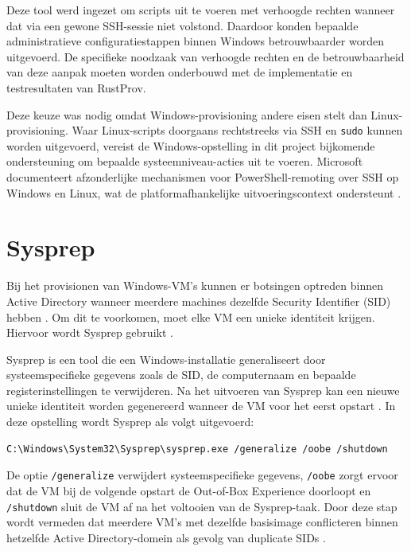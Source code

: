 Deze tool werd ingezet om scripts uit te voeren met verhoogde rechten wanneer dat via een gewone SSH-sessie niet volstond. Daardoor konden bepaalde administratieve configuratiestappen binnen Windows betrouwbaarder worden uitgevoerd. De specifieke noodzaak van verhoogde rechten en de betrouwbaarheid van deze aanpak moeten worden onderbouwd met de implementatie en testresultaten van RustProv.

Deze keuze was nodig omdat Windows-provisioning andere eisen stelt dan Linux-provisioning. Waar Linux-scripts doorgaans rechtstreeks via SSH en \texttt{sudo} kunnen worden uitgevoerd, vereist de Windows-opstelling in dit project bijkomende ondersteuning om bepaalde systeemniveau-acties uit te voeren. Microsoft documenteert afzonderlijke mechanismen voor PowerShell-remoting over SSH op Windows en Linux, wat de platformafhankelijke uitvoeringscontext ondersteunt \autocite{MicrosoftPS2025}.

\section{Sysprep}

Bij het provisionen van Windows-VM's kunnen er botsingen optreden binnen Active Directory wanneer meerdere machines dezelfde Security Identifier (SID)  hebben \autocite{MicrosoftSID2025}. Om dit te voorkomen, moet elke VM een unieke identiteit krijgen. Hiervoor wordt Sysprep gebruikt \autocite{MicrosoftSysprep2021}.

Sysprep is een tool die een Windows-installatie generaliseert door systeemspecifieke gegevens zoals de SID, de computernaam en bepaalde registerinstellingen te verwijderen. Na het uitvoeren van Sysprep kan een nieuwe unieke identiteit worden gegenereerd wanneer de VM voor het eerst opstart \autocite{MicrosoftSysprep2021,Russinovich2009}. In deze opstelling wordt Sysprep als volgt uitgevoerd:

\begin{lstlisting}[language=bash]
    C:\Windows\System32\Sysprep\sysprep.exe /generalize /oobe /shutdown
\end{lstlisting}

De optie \texttt{/generalize} verwijdert systeemspecifieke gegevens, \texttt{/oobe} zorgt ervoor dat de VM bij de volgende opstart de Out-of-Box Experience doorloopt en \texttt{/shutdown} sluit de VM af na het voltooien van de Sysprep-taak. Door deze stap wordt vermeden dat meerdere VM's met dezelfde basisimage conflicteren binnen hetzelfde Active Directory-domein als gevolg van duplicate SIDs \autocite{MicrosoftSID2025,Russinovich2009}.

